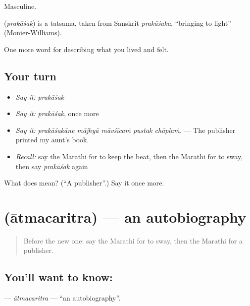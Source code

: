 Masculine.

\begin{cousinweb}
\textbf{} (\emph{prakāśak}) is a tatsama, taken from Sanskrit \emph{prakāśaka}, \textquotedblleft{}bringing to light\textquotedblright{} (Monier-Williams).
\end{cousinweb}

\begin{grammarlens}[title={What you've built}]
One more word for describing what you lived and felt.
\end{grammarlens}

\subsection*{Your turn}
\begin{itemize}
\raggedright
  \item \emph{Say it:} \emph{prakāśak}
  \item \emph{Say it:} \emph{prakāśak}, once more
  \item \emph{Say it:} \emph{prakāśakāne mājhyā māvśīcaṁ pustak chāplaṁ.} — The publisher printed my aunt's book.
  \item \emph{Recall:} say the Marathi for to keep the beat, then the Marathi for to sway, then say \emph{prakāśak} again
\end{itemize}

\begin{tcolorbox}[breakable,colback=teal!4,colframe=teal!35!black,title={Before you move on}]
What does  mean? (\textquotedblleft{}A publisher\textquotedblright{}.) Say it once more.
\end{tcolorbox}
\section[\texorpdfstring{\mr{आत्मचरित्र} (ātmacaritra)}{आत्मचरित्र (ātmacaritra)}]{ (ātmacaritra) — an autobiography}

\label{lesson:MR-C539-atmacaritra}



\begin{quote}
Before the new one: say the Marathi for to sway, then the Marathi for a publisher.
\end{quote}

\subsection*{You'll want to know: }
\textbf{} — \emph{ātmacaritra} — \textquotedblleft{}an autobiography\textquotedblright{}.

